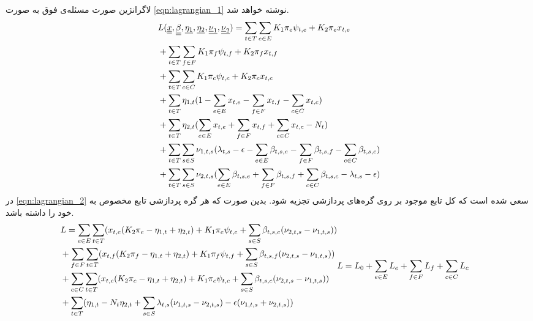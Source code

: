 		لاگرانژین صورت مسئله‌ی فوق به صورت \cref{eqn:lagrangian_1} نوشته خواهد شد.
		\begin{align}\label{eqn:lagrangian_1}
			&L(\underline{\underline x}, \underline{\underline \beta}, \underline {\eta_1}, \underline {\eta_2}, \underline{\underline \nu_1}, \underline{\underline \nu_2}) = \sum_{t \in T}\sum_{e \in E} K_1\pi_e\psi_{t,e}+K_2\pi_ex_{t,e} \notag \\
			&+ \sum_{t \in T}\sum_{f \in F} K_1\pi_f\psi_{t,f}+K_2\pi_fx_{t,f} \notag \\
			&+ \sum_{t \in T}\sum_{c \in C} K_1\pi_c\psi_{t,c}+K_2\pi_cx_{t,c} \notag \\
			&+ \sum_{t \in T  }{\eta_{1,t}(1-\sum_{e \in E}x_{t,e} - \sum_{f \in F}x_{t,f} - \sum_{c \in C}x_{t,c})} \notag \\
			&+ \sum_{t \in T}{\eta_{2,t}(\sum_{e \in E}x_{t,e} + \sum_{f \in F}x_{t,f} + \sum_{c \in C}x_{t,c}-N_t)} \notag \\
			&+ \sum_{t \in T}\sum_{s \in S}{\nu_{1,t,s}(\lambda_{t,s} - \epsilon - \sum_{e \in E}\beta_{t,s,e} - \sum_{f \in F}\beta_{t,s,f} - \sum_{c \in C}\beta_{t,s,c})} \notag \\
			&+ \sum_{t \in T}\sum_{s \in S}{\nu_{2,t,s}(\sum_{e \in E}\beta_{t,s,e} + \sum_{f \in F}\beta_{t,s,f} + \sum_{c \in C}\beta_{t,s,c} -\lambda_{t,s} - \epsilon)}
 		\end{align}
	در \cref{eqn:lagrangian_2} سعی شده است که کل تابع موجود بر روی گره‌های پردازشی تجزیه شود. بدین صورت که هر گره پردازشی تابع مخصوص به خود را داشته باشد.
	\begin{subequations}\label{eqn:lagrangian_2}
		\begin{align}
			&L = \sum_{e \in E}\sum_{t \in T}(x_{t,e}(K_2\pi_e-\eta_{1,t}+\eta_{2,t}) + K_1\pi_e\psi_{t,e} + \sum_{s \in S}\beta_{t,s,e}(\nu_{2,t,s} - \nu_{1,t,s})) \notag \\
			&+ \sum_{f \in F}\sum_{t \in T}(x_{t,f}(K_2\pi_f-\eta_{1,t}+\eta_{2,t}) + K_1\pi_f\psi_{t,f} + \sum_{s \in S}\beta_{t,s,f}(\nu_{2,t,s}-\nu_{1,t,s})) \notag \\
			&+ \sum_{c \in C}\sum_{t \in T}(x_{t,c}(K_2\pi_c-\eta_{1,t}+\eta_{2,t}) + K_1\pi_c\psi_{t,c} + \sum_{s \in S}\beta_{t,s,c}(\nu_{2,t,s}-\nu_{1,t,s})) \notag \\
			&+\sum_{t \in T}(\eta_{1,t} - N_t\eta_{2,t} + \sum_{s \in S}\lambda_{t,s}(\nu_{1,t,s}-\nu_{2,t,s}) -\epsilon(\nu_{1,t,s}+\nu_{2,t,s}))
		\end{align}
		\begin{align}
			&L = L_0 + \sum_{e \in E}L_e + \sum_{f \in F}L_f + \sum_{c \in C}L_c
		\end{align}
	\end{subequations}

